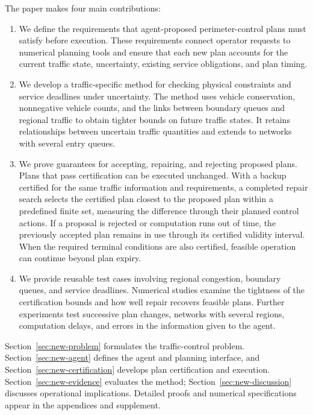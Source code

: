 \documentclass[journal,10pt]{IEEEtran}
\begin{document}
The paper makes four main contributions:
\begin{enumerate}
\item We define the requirements that agent-proposed perimeter-control plans
must satisfy before execution. These requirements connect operator requests
to numerical planning tools and ensure that each new plan accounts for the
current traffic state, uncertainty, existing service obligations, and plan
timing.

\item We develop a traffic-specific method for checking physical constraints
and service deadlines under uncertainty. The method uses vehicle
conservation, nonnegative vehicle counts, and the links between boundary
queues and regional traffic to obtain tighter bounds on future traffic
states. It retains relationships between uncertain traffic quantities and
extends to networks with several entry queues.

\item We prove guarantees for accepting, repairing, and rejecting proposed
plans. Plans that pass certification can be executed unchanged. With a
backup certified for the same traffic information and requirements, a
completed repair search selects the certified plan closest to the proposed
plan within a predefined finite set, measuring the difference through their
planned control actions. If a proposal is rejected or computation runs out
of time, the previously accepted plan remains in use through its certified
validity interval. When the required terminal conditions are also certified,
feasible operation can continue beyond plan expiry.

\item We provide reusable test cases involving regional congestion, boundary
queues, and service deadlines. Numerical studies examine the tightness of
the certification bounds and how well repair recovers feasible plans.
Further experiments test successive plan changes, networks with several
regions, computation delays, and errors in the information given to the
agent.
\end{enumerate}

Section~\ref{sec:new-problem} formulates the traffic-control problem. Section~\ref{sec:new-agent} defines the agent and planning interface, and Section~\ref{sec:new-certification} develops plan certification and execution. Section~\ref{sec:new-evidence} evaluates the method; Section~\ref{sec:new-discussion} discusses operational implications. Detailed proofs and numerical specifications appear in the appendices and supplement.
\end{document}
